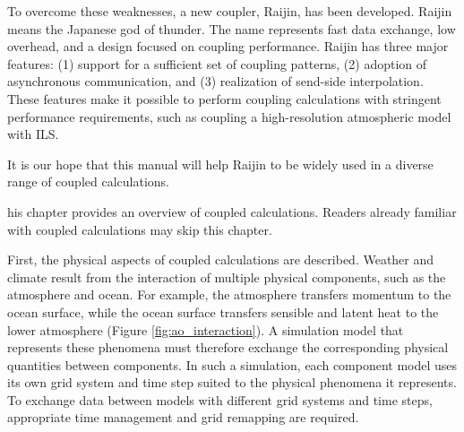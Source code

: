 \documentclass[11pt,a4paper]{report}
\newcommand{\figref}[1]{Figure \ref{#1}}
\begin{document}
To overcome these weaknesses,
a new coupler, Raijin, has been developed.
Raijin means the Japanese god of thunder.
The name represents fast data exchange,
low overhead, and a design focused on coupling performance.
Raijin has three major features:
(1) support for a sufficient set of coupling patterns,
(2) adoption of asynchronous communication,
and (3) realization of send-side interpolation.
These features make it possible to perform
coupling calculations with stringent performance requirements,
such as coupling a high-resolution atmospheric model with ILS.

It is our hope that this manual will help Raijin
to be widely used
in a diverse range of coupled calculations.

\begingroup
\renewcommand{\chapter}[2]{}  %

%

\endgroup


\chapter{Introduction to Coupled Calculations}

This chapter provides an overview of coupled calculations.
Readers already familiar with coupled calculations may skip this chapter.

First, the physical aspects of coupled calculations are described.
Weather and climate result from the interaction of multiple physical components,
such as the atmosphere and ocean.
For example, the atmosphere transfers momentum to the ocean surface,
while the ocean surface transfers sensible and latent heat
to the lower atmosphere (\figref{fig:ao_interaction}).
A simulation model that represents these phenomena
must therefore exchange the corresponding physical quantities between components.
In such a simulation, each component model uses its own grid system and time step
suited to the physical phenomena it represents.
To exchange data between models with different grid systems and time steps,
appropriate time management and grid remapping are required.
\end{document}
